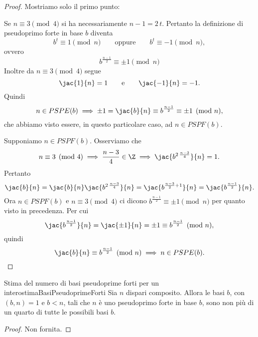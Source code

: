 	\begin{proof}
	Mostriamo solo il primo punto:

	\graffito{\(\Leftarrow)\)}Se \(n\equiv 3 \pmod{4}\) si ha necessariamente \(n-1=2\,t\).
	Pertanto la definizione di pseudoprimo forte in base \(b\) diventa
		\[
		b^t \equiv 1 \pmod{n} \qquad\text{oppure}\qquad b^t \equiv -1 \pmod{n},
		\]
	ovvero
		\[
		b^{\frac{n-1}{2}} \equiv \pm 1 \pmod{n}
		\]
	Inoltre da \(n\equiv 3 \pmod{4}\) segue
		\[
		\jac{1}{n} = 1 \qquad\text{e}\qquad \jac{-1}{n} = -1.
		\]
	Quindi
		\[
		n \in PSPE(b) \implies \pm 1 = \jac{b}{n} \equiv b^{\frac{n-1}{2}} \equiv \pm 1 \pmod{n},
		\]
	che abbiamo visto essere, in questo particolare caso, ad \(n\in PSPF(b)\).

	\graffito{\(\Rightarrow)\)}Supponiamo \(n\in PSPF(b)\).
	Osserviamo che
		\[
		n \equiv 3 \pmod{4} \implies \frac{n-3}{4} \in \Z \implies \jac{b^{2\,\frac{n-3}{4}}}{n} = 1.
		\]
	Pertanto
		\[
		\jac{b}{n} = \jac{b}{n}\jac{b^{2\,\frac{n-3}{4}}}{n} = \jac{b^{\frac{n-3}{2}+1}}{n} = \jac{b^{\frac{n-1}{2}}}{n}.
		\]
	Ora \(n\in PSPF(b)\) e \(n\equiv 3 \pmod{4}\) ci dicono \(b^{\frac{n-1}{2}}\equiv \pm 1 \pmod{n}\) per quanto visto in precedenza. Per cui
		\[
		\jac{b^{\frac{n-1}{2}}}{n} = \jac{\pm 1}{n} = \pm 1 \equiv b^{\frac{n-1}{2}} \pmod{n},
		\]
	quindi
		\[
		\jac{b}{n} \equiv b^{\frac{n-1}{2}} \pmod{n} \implies n \in PSPE(b).\qedhere
		\]
	\end{proof}

	\begin{prop}{Stima del numero di basi pseudoprime forti per un intero}{stimaBasiPseudoprimeForti}
	Sia \(n\) dispari composito. Allora le basi \(b\), con \((b,n)=1\) e \(b<n\), tali che \(n\) è uno pseudoprimo forte in base \(b\), sono non più di un quarto di tutte le possibili basi \(b\).
	\end{prop}

	\begin{proof}
	Non fornita.
	\end{proof}

